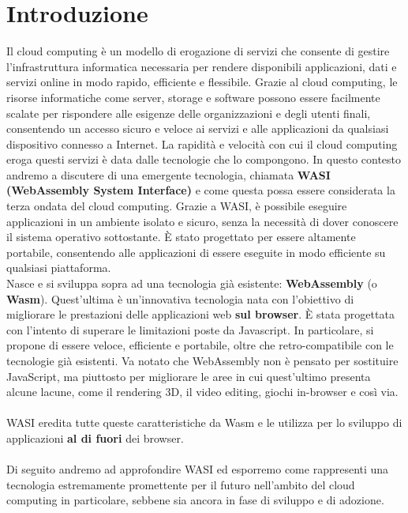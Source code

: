 \chapter{Introduzione}
\label{chap:introduction}

Il cloud computing è un modello di erogazione di servizi che consente di gestire l'infrastruttura informatica necessaria per rendere disponibili applicazioni, dati e servizi online in modo rapido, efficiente e flessibile. Grazie al cloud computing, le risorse informatiche come server, storage e software possono essere facilmente scalate per rispondere alle esigenze delle organizzazioni e degli utenti finali, consentendo un accesso sicuro e veloce ai servizi e alle applicazioni da qualsiasi dispositivo connesso a Internet. La rapidità e velocità con cui il cloud computing eroga questi servizi è data dalle tecnologie che lo compongono.
In questo contesto andremo a discutere di una emergente tecnologia, chiamata \textbf{WASI (WebAssembly System Interface)} e come questa possa essere considerata la terza ondata del cloud computing.
Grazie a WASI, è possibile eseguire applicazioni in un ambiente isolato e sicuro, senza la necessità di dover conoscere il sistema operativo sottostante. È stato progettato per essere altamente portabile, consentendo alle applicazioni di essere eseguite in modo efficiente su qualsiasi piattaforma.
\\
Nasce e si sviluppa sopra ad una tecnologia già esistente: \textbf{WebAssembly} (o \textbf{Wasm}). Quest'ultima è un'innovativa tecnologia nata con l'obiettivo di migliorare le prestazioni delle applicazioni web \textbf{sul browser}. È stata progettata con l'intento di superare le limitazioni poste da Javascript. In particolare, si propone di essere veloce, efficiente e portabile, oltre che retro-compatibile con le tecnologie già esistenti. Va notato che WebAssembly non è pensato per sostituire JavaScript, ma piuttosto per migliorare le aree in cui quest'ultimo presenta alcune lacune, come il rendering 3D, il video editing, giochi in-browser e così via.
\\\\
WASI eredita tutte queste caratteristiche da Wasm e le utilizza per lo sviluppo di applicazioni \textbf{al di fuori} dei browser.
\\\\
Di seguito andremo ad approfondire WASI ed esporremo come rappresenti una tecnologia estremamente promettente per il futuro nell’ambito del cloud computing in particolare, sebbene sia ancora in fase di sviluppo e di adozione.

